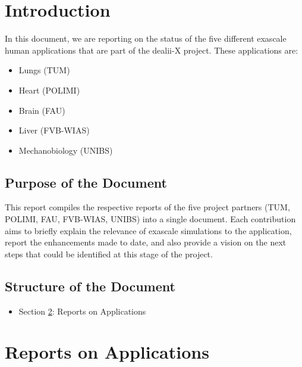 \documentclass[a4paper,12pt]{article}
\begin{document}
\vspace*{2cm}

\disclaimer

\newpage

\tableofcontents %

\newpage

\section{{Introduction}}
In this document, we are reporting on the status of the five different exascale human applications that are part of the dealii-X project.
These applications are:
\begin{itemize}
    \item Lungs (TUM)
    \item Heart (POLIMI)
    \item Brain (FAU)
    \item Liver (FVB-WIAS)
    \item Mechanobiology (UNIBS)
\end{itemize}

\subsection{{Purpose of the Document}}
This report compiles the respective reports of the five project partners (TUM, POLIMI, FAU, FVB-WIAS, UNIBS) into a single document.
Each contribution aims to briefly explain the relevance of exascale simulations to the application, report the enhancements made to date, and also provide a vision on the next steps that could be identified at this stage of the project.
\subsection{{Structure of the Document}}
\begin{itemize}
    \item Section \ref{sec:section2}: Reports on Applications
\end{itemize}

\newpage

\section{Reports on Applications}
\label{sec:section2}
\end{document}
